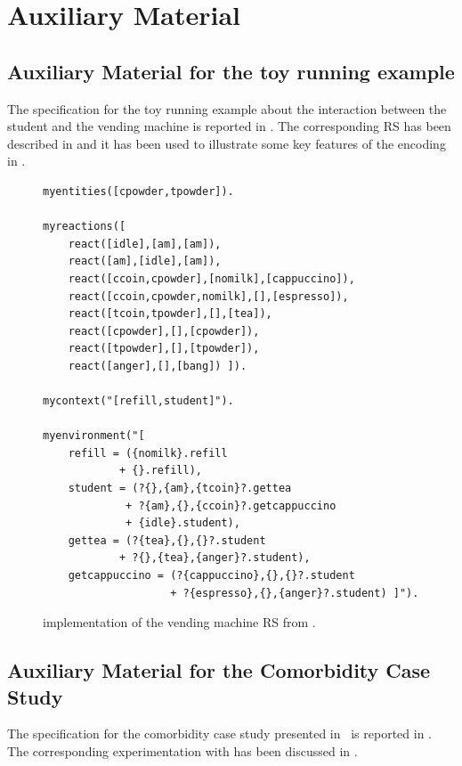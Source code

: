 
\section{Auxiliary Material}

\subsection{Auxiliary Material for the toy running example}

The \BioResolve specification for the toy running example about the interaction between the student and the vending machine is reported in . The corresponding RS has been described in  and it has been used to illustrate some key features of the \GROOVE encoding in .

\begin{figure}[t]
\begin{minipage}{0.9\linewidth}
\footnotesize
\begin{verbatim}
myentities([cpowder,tpowder]).

myreactions([
    react([idle],[am],[am]),
    react([am],[idle],[am]),
    react([ccoin,cpowder],[nomilk],[cappuccino]),
    react([ccoin,cpowder,nomilk],[],[espresso]),
    react([tcoin,tpowder],[],[tea]),
    react([cpowder],[],[cpowder]),
    react([tpowder],[],[tpowder]),
    react([anger],[],[bang]) ]).

mycontext("[refill,student]").

myenvironment("[
    refill = ({nomilk}.refill 
            + {}.refill),
    student = (?{},{am},{tcoin}?.gettea 
             + ?{am},{},{ccoin}?.getcappuccino 
             + {idle}.student),
    gettea = (?{tea},{},{}?.student
            + ?{},{tea},{anger}?.student),
    getcappuccino = (?{cappuccino},{},{}?.student 
                    + ?{espresso},{},{anger}?.student) ]").
\end{verbatim}
\end{minipage}
\caption{\BioResolve implementation of the vending machine RS from .}
\label{fig:bioresolve:toy}
\end{figure}

\subsection{Auxiliary Material for the Comorbidity Case Study}

The \BioResolve specification for the comorbidity case study presented in~\cite{DBLP:conf/cmsb/BowlesBBFGM24} is reported in . The corresponding experimentation with \GROOVE has been discussed in .

